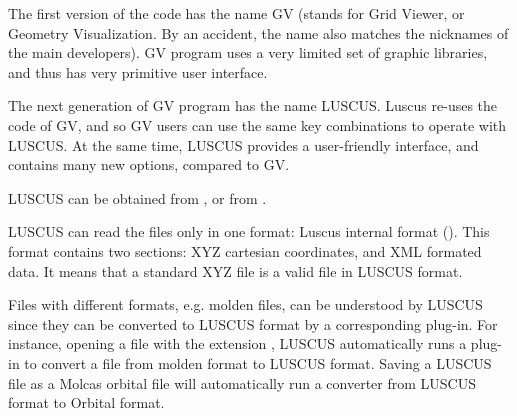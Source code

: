 The first version of the code has the name GV (stands for Grid Viewer, or Geometry Visualization. 
By an accident, the name also matches the nicknames of the main developers).
GV program uses a very limited set of graphic libraries, and thus has very primitive 
user interface.

The next generation of GV program has the name LUSCUS. Luscus re-uses the code of GV, 
and so GV users can use the same key combinations to operate with LUSCUS. 
At the same time, LUSCUS provides a user-friendly interface, and contains many new 
options, compared to GV. 

LUSCUS can be obtained from , or 
from .

LUSCUS can read the files only in one format: Luscus internal format ().
This format contains two sections: XYZ cartesian coordinates, and XML 
formated data. It means that a standard XYZ file is a valid file in LUSCUS format. 

Files with different formats, e.g. molden files, can be understood by LUSCUS 
since they can be converted to LUSCUS format by a corresponding plug-in. 
For instance, opening a file with the extension , LUSCUS automatically 
runs a plug-in to convert a file from molden format to LUSCUS format. Saving a 
LUSCUS file as a Molcas orbital file will automatically run a converter 
from LUSCUS format to Orbital format.

